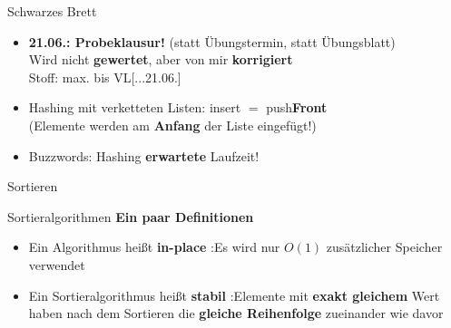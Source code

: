 

\def\haslogo{}


\date{02. Juni \thisyear}



	
	
	\begin{frame}
		\titlepage
	\end{frame}
	

\begin{frame}{Schwarzes Brett}
	\begin{itemize}
		\item \textbf{21.06.: Probeklausur!} (statt Übungstermin, statt Übungsblatt) \\
		Wird nicht \textbf{gewertet}, aber von mir \textbf{korrigiert} \\
		Stoff: max. bis VL[...21.06.]
		\pause
		\item Hashing mit verketteten Listen: insert $=$ push\textbf{Front} \\
		(Elemente werden am \textbf{Anfang} der Liste eingefügt!)
		\pause
		\item Buzzwords: Hashing \gdw \textbf{erwartete} Laufzeit!
	\end{itemize}
\end{frame}

\begin{headframe}[] %
	Sortieren
\end{headframe}

\begin{frame}{Sortieralgorithmen}
	\textbf{Ein paar Definitionen} \\[0,125cm]
	\begin{itemize}
		\item Ein Algorithmus heißt \textbf{in-place} :\gdw Es wird nur $O(1)$ zusätzlicher Speicher verwendet
		\pause
		\item Ein Sortieralgorithmus heißt \textbf{stabil} :\gdw Elemente mit \textbf{exakt gleichem} Wert haben nach dem Sortieren die \textbf{gleiche Reihenfolge} zueinander wie davor
	\end{itemize}
\end{frame}
	
